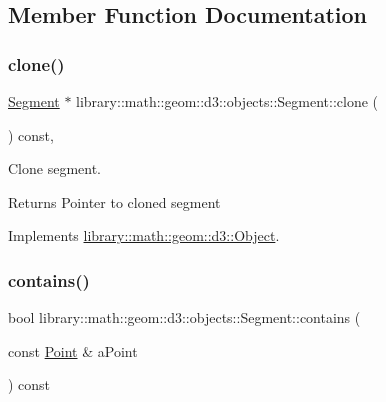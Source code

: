 \subsection{Member Function Documentation}
\mbox{\label{classlibrary_1_1math_1_1geom_1_1d3_1_1objects_1_1_segment_a589ad56339616f362cee84a2ecab61a4}} 
\subsubsection{\texorpdfstring{clone()}{clone()}}
{\footnotesize\ttfamily \hyperlink{classlibrary_1_1math_1_1geom_1_1d3_1_1objects_1_1_segment}{Segment} $\ast$ library\+::math\+::geom\+::d3\+::objects\+::\+Segment\+::clone (\begin{DoxyParamCaption}{ }\end{DoxyParamCaption}) const\hspace{0.3cm}{\ttfamily [override]}, {\ttfamily [virtual]}}



Clone segment. 

\begin{DoxyReturn}{Returns}
Pointer to cloned segment 
\end{DoxyReturn}


Implements \hyperlink{classlibrary_1_1math_1_1geom_1_1d3_1_1_object_a1a784c6b359e0eb97cd34fabc42f2f3f}{library\+::math\+::geom\+::d3\+::\+Object}.

\mbox{\label{classlibrary_1_1math_1_1geom_1_1d3_1_1objects_1_1_segment_aabdbcd6bbfbe9350fe53f1b3563b5652}} 
\subsubsection{\texorpdfstring{contains()}{contains()}}
{\footnotesize\ttfamily bool library\+::math\+::geom\+::d3\+::objects\+::\+Segment\+::contains (\begin{DoxyParamCaption}\item[{const \hyperlink{classlibrary_1_1math_1_1geom_1_1d3_1_1objects_1_1_point}{Point} \&}]{a\+Point }\end{DoxyParamCaption}) const}



